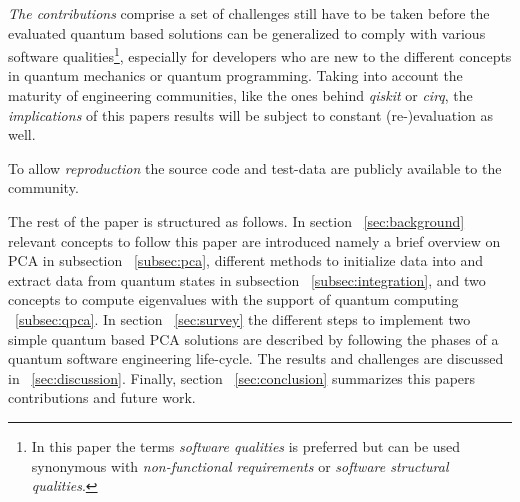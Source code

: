 \emph{The contributions} comprise a set of challenges still have to be taken before the evaluated quantum based solutions can be generalized to comply with various software qualities\footnote{In this paper the terms \emph{software qualities} is preferred but can be used synonymous with \emph{non-functional requirements} or \emph{software structural qualities}.}, especially for developers who are new to the different concepts in quantum mechanics or quantum programming. Taking into account the maturity of engineering communities, like the ones behind \emph{qiskit} or \emph{cirq}, the \emph{implications} of this papers results will be subject to constant (re-)evaluation as well.

To allow \emph{reproduction} the source code and test-data are publicly available to the community. \cite{github_repo}

The rest of the paper is structured as follows. In section ~\ref{sec:background} relevant concepts to follow this paper are introduced namely a brief overview on PCA in subsection ~\ref{subsec:pca}, different methods to initialize data into and extract data from quantum states in subsection ~\ref{subsec:integration}, and two concepts to compute eigenvalues with the support of quantum computing ~\ref{subsec:qpca}. In section ~\ref{sec:survey} the different steps to implement two simple quantum based PCA solutions are described by following the phases of a quantum software engineering life-cycle. The results and challenges are discussed in ~\ref{sec:discussion}. Finally, section ~\ref{sec:conclusion} summarizes this papers contributions and future work.


